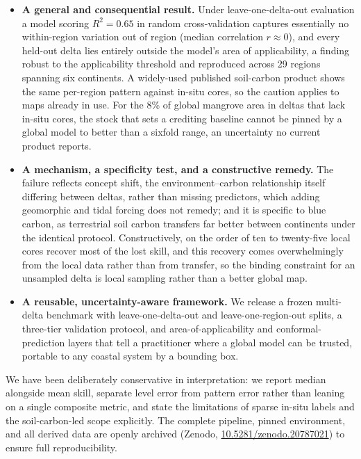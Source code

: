 \documentclass[11pt]{letter}
\begin{document}
\begin{itemize}
  \item \textbf{A general and consequential result.} Under leave-one-delta-out evaluation
  a model scoring $R^2=0.65$ in random cross-validation captures essentially no
  within-region variation out of region (median correlation $r\approx0$), and every
  held-out delta lies entirely outside the model's area of applicability, a finding robust
  to the applicability threshold and reproduced across 29 regions spanning six continents.
  A widely-used published soil-carbon product shows the same per-region pattern against
  in-situ cores, so the caution applies to maps already in use. For the 8\% of global
  mangrove area in deltas that lack in-situ cores, the stock that sets a crediting baseline
  cannot be pinned by a global model to better than a sixfold range, an uncertainty no
  current product reports.
  \item \textbf{A mechanism, a specificity test, and a constructive remedy.} The failure
  reflects concept shift, the environment--carbon relationship itself differing between
  deltas, rather than missing predictors, which adding geomorphic and tidal forcing does
  not remedy; and it is specific to blue carbon, as terrestrial soil carbon transfers far
  better between continents under the identical protocol. Constructively, on the order of
  ten to twenty-five local cores recover most of the lost skill, and this recovery comes
  overwhelmingly from the local data rather than from transfer, so the binding constraint
  for an unsampled delta is local sampling rather than a better global map.
  \item \textbf{A reusable, uncertainty-aware framework.} We release a frozen multi-delta
  benchmark with leave-one-delta-out and leave-one-region-out splits, a three-tier
  validation protocol, and area-of-applicability and conformal-prediction layers that tell
  a practitioner where a global model can be trusted, portable to any coastal system by a
  bounding box.
\end{itemize}

We have been deliberately conservative in interpretation: we report median alongside mean
skill, separate level error from pattern error rather than leaning on a single composite
metric, and state the limitations of sparse in-situ labels and the soil-carbon-led scope
explicitly. The complete pipeline, pinned environment, and all derived data are openly
archived (Zenodo, \href{https://doi.org/10.5281/zenodo.20787021}{10.5281/zenodo.20787021})
to ensure full reproducibility.
\end{document}
